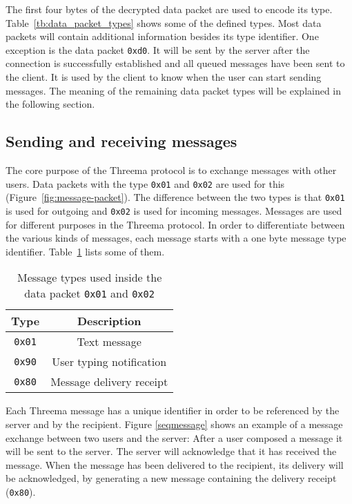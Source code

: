 \documentclass[11pt,a4paper,bookmarksopen=true]{article}
\begin{document}
The first four bytes of the decrypted data packet are used to encode
its type.  Table~\ref{tb:data_packet_types} shows some of the defined
types.
Most data packets will contain additional information besides its type identifier.
One exception is the data packet \texttt{0xd0}. It will be sent by the server after the
connection is successfully established and all queued messages have been sent to the client.
It is used by the client to know when the user can start sending messages. The meaning of the
remaining data packet types will be explained in the following section.

\subsection{Sending and receiving messages}\label{sec:messages}

The core purpose of the Threema protocol is to exchange messages with
other users. Data packets with the type \texttt{0x01} and \texttt{0x02} are used for this
(Figure~\ref{fig:message-packet}). The difference between the two
types is that \texttt{0x01} is used for outgoing and \texttt{0x02} is used for incoming
messages. Messages are used for different purposes in the Threema
protocol. In order to differentiate between the various kinds of
messages, each message starts with a one byte message type
identifier.  Table~\ref{tb:message_types} lists some of them.

\begin{table}[h]
  \centering
  \begin{tabular}{|c |c|}
    \hline
    Type          & Description              \\ \hline
    \texttt{0x01} & Text message             \\ \hline
    \texttt{0x90} & User typing notification \\ \hline
    \texttt{0x80} & Message delivery receipt \\ \hline
  \end{tabular}
  \caption{Message types used inside the data packet \texttt{0x01} and \texttt{0x02}}
  \label{tb:message_types}
\end{table}

Each Threema message has a unique identifier in order to be referenced
by the server and by the recipient.  Figure \ref{seqmessage} shows an
example of a message exchange between two users and the server: After
a user composed a message it will be sent to the server. The server will
acknowledge that it has received the message.  When the message has
been delivered to the recipient, its delivery will be acknowledged,
by generating a new message containing the delivery receipt (\texttt{0x80}).
\end{document}
